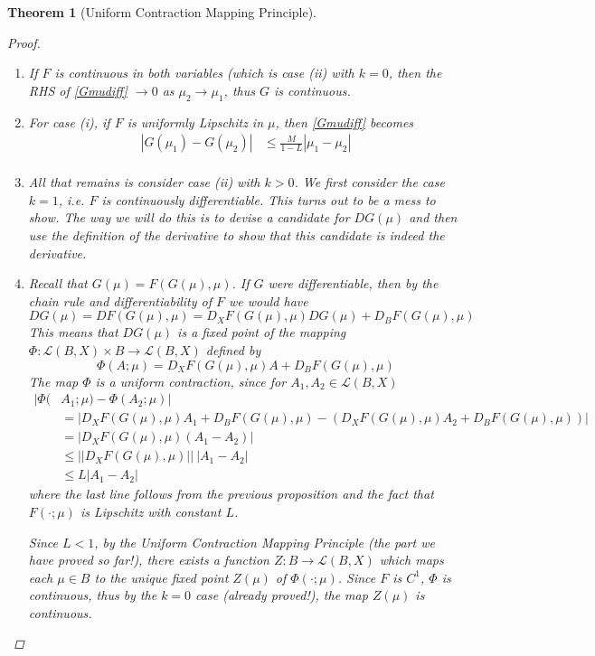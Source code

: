 \documentclass[10pt]{article}         %
\newtheorem{theorem}{Theorem}[section]
\theoremstyle{remark}
\begin{document}
\begin{theorem}[Uniform Contraction Mapping Principle]
\begin{proof}
\begin{enumerate}
\item If $F$ is continuous in both variables (which is case (ii) with $k = 0$, then the RHS of \eqref{Gmudiff} $\rightarrow 0$ as $\mu_2 \rightarrow \mu_1$, thus $G$ is continuous.

\item For case (i), if $F$ is uniformly Lipschitz in $\mu$, then \eqref{Gmudiff} becomes 
\begin{align*}
|G(\mu_1) - G(\mu_2)| &\leq \frac{M}{1-L} |\mu_1 - \mu_2| \\
\end{align*}

\item All that remains is consider case (ii) with $k > 0$. We first consider the case $k = 1$, i.e. $F$ is continuously differentiable. This turns out to be a mess to show. The way we will do this is to devise a candidate for $DG(\mu)$ and then use the definition of the derivative to show that this candidate is indeed the derivative.

\item Recall that $G(\mu) = F(G(\mu),\mu)$. If $G$ were differentiable, then by the chain rule and differentiability of $F$ we would have
\[
DG(\mu) = DF(G(\mu),\mu) = D_X F(G(\mu), \mu)DG(\mu) + D_B F(G(\mu), \mu)
\]
This means that $DG(\mu)$ is a fixed point of the mapping $\Phi: \mathcal{L}(B, X) \times B \rightarrow \mathcal{L}(B, X)$ defined by
\[
\Phi(A; \mu) = D_X F(G(\mu), \mu) A + D_B F(G(\mu), \mu)
\]
The map $\Phi$ is a uniform contraction, since for $A_1, A_2 \in \mathcal{L}(B, X)$
\begin{align*}
|\Phi(&A_1; \mu) - \Phi(A_2; \mu)| \\
&= | D_X F(G(\mu), \mu) A_1 + D_B F(G(\mu), \mu) - (D_X F(G(\mu), \mu) A_2 + D_B F(G(\mu), \mu)) | \\
&= | D_X F(G(\mu), \mu) (A_1 - A_2) | \\
&\leq ||D_X F(G(\mu), \mu) ||\:|A_1 - A_2| \\
&\leq L |A_1 - A_2|
\end{align*}
where the last line follows from the previous proposition and the fact that $F(\cdot; \mu)$ is Lipschitz with constant $L$.

Since $L < 1$, by the Uniform Contraction Mapping Principle (the part we have proved so far!), there exists a function $Z: B \rightarrow \mathcal{L}(B, X)$ which maps each $\mu \in B$ to the unique fixed point $Z(\mu)$ of $\Phi(\cdot; \mu)$. Since $F$ is $C^1$, $\Phi$ is continuous, thus by the $k = 0$ case (already proved!), the map $Z(\mu)$ is continuous.
    

\end{enumerate}
\end{proof}
\end{theorem}
\end{document}
